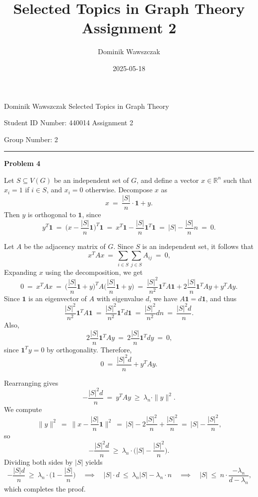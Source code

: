 \documentclass[12pt]{article}
\title{Selected Topics in Graph Theory Assignment 2}
\author{Dominik Wawszczak}
\date{2025-05-18}
\begin{document}
	\setlength{\parindent}{0 cm}
	
	Dominik Wawszczak \hfill Selected Topics in Graph Theory
	
	Student ID Number: 440014 \hfill Assignment 2
	
	Group Number: 2
	
	\bigskip
	\hrule
	\bigskip
	
	\textbf{Problem 4}
	
	\medskip
	
	Let \(S \subseteq V(G)\) be an independent set of \(G\), and define a vector
	\(x \in \mathbb{R}^n\) such that \(x_{i} = 1\) if \(i \in S\), and \(x_{i} =
	0\) otherwise. Decompose \(x\) as
	\[
		x \ = \ \frac{|S|}{n} \cdot \mathbf{1} + y \text{.}
	\]
	Then \(y\) is orthogonal to \(\mathbf{1}\), since
	\[
		y^{T} \mathbf{1} \ = \ \bigg( x - \frac{|S|}{n} \mathbf{1} \bigg)^{T}
		\mathbf{1} \ = \ x^{T} \mathbf{1} - \frac{|S|}{n} \mathbf{1}^{T}
		\mathbf{1} \ = \ |S| - \frac{|S|}{n} n \ = \ 0 \text{.}
	\]
	
	\medskip
	
	Let \(A\) be the adjacency matrix of \(G\). Since \(S\) is an independent
	set, it follows that
	\[
		x^{T} A x \ = \ \sum\limits_{i \in S} \sum\limits_{j \in S} A_{ij} \ = \
		0 \text{,}
	\]
	Expanding \(x\) using the decomposition, we get
	\[
		0 \ = \ x^{T} A x \ = \ \bigg( \frac{|S|}{n} \mathbf{1} + y \bigg)^{T} A
		\bigg( \frac{|S|}{n} \mathbf{1} + y \bigg) \ = \ \frac{|S|^{2}}{n^{2}}
		\mathbf{1}^{T} A \mathbf{1} + 2 \frac{|S|}{n} \mathbf{1}^{T} A y + y^{T}
		A y \text{.}
	\]
	Since \(\mathbf{1}\) is an eigenvector of \(A\) with eigenvalue \(d\), we
	have \(A \mathbf{1} = d \mathbf{1}\), and thus
	\[
		\frac{|S|^{2}}{n^{2}} \mathbf{1}^{T} A \mathbf{1} \ = \
		\frac{|S|^{2}}{n^{2}} \mathbf{1}^{T} d \mathbf{1} \ = \
		\frac{|S|^{2}}{n^{2}} d n \ = \ \frac{|S|^{2} d}{n} \text{.}
	\]
	Also,
	\[
		2 \frac{|S|}{n} \mathbf{1}^{T} A y \ = \ 2 \frac{|S|}{n} \mathbf{1}^{T}
		d y \ = \ 0 \text{,}
	\]
	since \(\mathbf{1}^{T} y = 0\) by orthogonality. Therefore,
	\[
		0 \ = \ \frac{|S|^{2} d}{n} + y^{T} A y \text{.}
	\]
	
	\medskip
	
	Rearranging gives
	\[
		- \frac{|S|^{2} d}{n} \ = \ y^{T} A y \ \geqslant \ \lambda_{n} \cdot
		\|y\|^{2} \text{.}
	\]
	We compute
	\[
		\|y\|^{2} \ = \ \bigg\| x - \frac{|S|}{n} \mathbf{1} \bigg\|^{2} \ = \
		|S| - 2 \frac{|S|^{2}}{n} + \frac{|S|^{2}}{n} \ = \ |S| -
		\frac{|S|^{2}}{n} \text{,}
	\]
	so
	\[
		- \frac{|S|^{2} d}{n} \ \geqslant \ \lambda_{n} \cdot \bigg( |S| -
		\frac{|S|^{2}}{n} \bigg) \text{.}
	\]
	Dividing both sides by \(|S|\) yields
	\[
		- \frac{|S| d}{n} \ \geqslant \ \lambda_{n} \cdot \bigg( 1 -
		\frac{|S|}{n} \bigg) \quad \implies \quad |S| \cdot d \ \leqslant \
		\lambda_{n} |S| - \lambda_{n} \cdot n \quad \implies \quad |S| \
		\leqslant \ n \cdot \frac{- \lambda_{n}}{d - \lambda_{n}} \text{,}
	\]
	which completes the proof.
\end{document}
